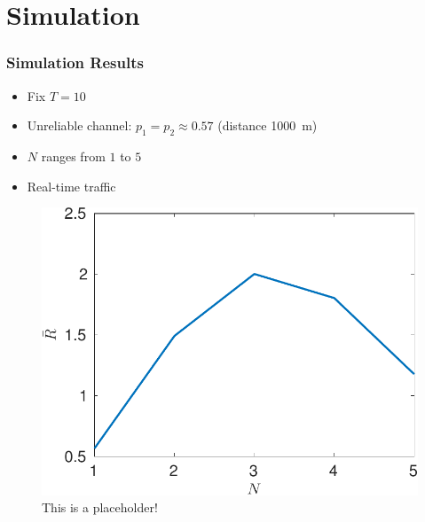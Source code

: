 \documentclass{beamer}
\begin{document}
\section{Simulation}

\begin{frame}
\frametitle{Simulation Results}
\begin{itemize}
  \item Fix $T=10$
\item Unreliable channel: $p_1 = p_2 \approx 0.57$ (distance \SI{1000}{m})
\item $N$ ranges from $1$ to $5$
\item Real-time traffic
\end{itemize}
\begin{figure}[htbp]
  \centering
  \includegraphics[draft,height=.5\textheight]{realtime_throughput_N.pdf}
  \caption{This is a placeholder!}
\end{figure}
\end{frame}
\end{document}
